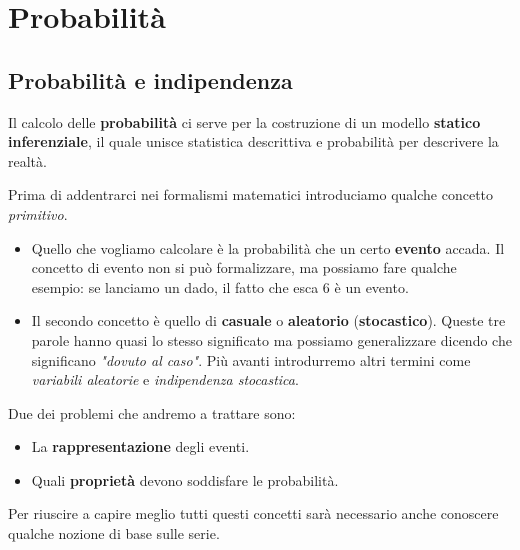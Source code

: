 \part{Probabilità}

\chapter{Probabilità e indipendenza}
Il calcolo delle \textbf{probabilità} ci serve per la costruzione di un modello
\textbf{statico inferenziale}, il quale unisce statistica descrittiva e probabilità per descrivere
la realtà.

Prima di addentrarci nei formalismi matematici introduciamo qualche concetto \emph{primitivo}.
\begin{itemize}
	\item Quello che vogliamo calcolare è la probabilità che un certo \textbf{evento} accada. Il
	      concetto
	      di evento non si può formalizzare, ma possiamo fare qualche esempio: se lanciamo un dado,
	      il fatto che esca 6 è un evento.
	\item Il secondo concetto è quello di \textbf{casuale} o \textbf{aleatorio}
	      (\textbf{stocastico}). Queste tre parole hanno quasi lo stesso significato ma possiamo
	      generalizzare dicendo che significano \emph{"dovuto al caso"}. Più avanti introdurremo
	      altri termini come \emph{variabili aleatorie} e \emph{indipendenza stocastica}.
\end{itemize}
Due dei problemi che andremo a trattare sono:
\begin{itemize}
	\item La \textbf{rappresentazione} degli eventi.
	\item Quali \textbf{proprietà} devono soddisfare le probabilità.
\end{itemize}
Per riuscire a capire meglio tutti questi concetti sarà necessario anche conoscere qualche nozione
di base sulle serie.
